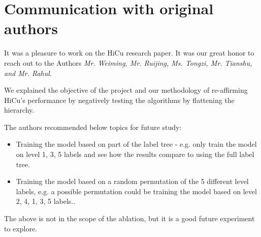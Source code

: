 \documentclass[11pt,a4paper]{article}
\begin{document}
\section{Communication with original authors}

It was a pleasure to work on the HiCu research paper. It was our great honor to reach out to the Authors \textit{Mr. Weiming, Mr. Ruijing, Ms. Tongzi, Mr. Tianshu, and Mr. Rahul}.

We explained the objective of the project and our methodology of re-affirming HiCu's performance by negatively testing the algorithms by flattening the hierarchy.

The authors recommended below topics for future study:
\begin{itemize}
    \item Training the model based on part of the label tree - e.g. only train the model on level 1, 3, 5 labels and see how the results compare to using the full label tree.
    \item Training the model based on a random permutation of the 5 different level labels, e.g. a possible permutation could be training the model based on level 2, 4, 1, 3, 5 labels..
\end{itemize}
The above is not in the scope of the ablation, but it is a good future experiment to explore.

\newpage



\end{document}
